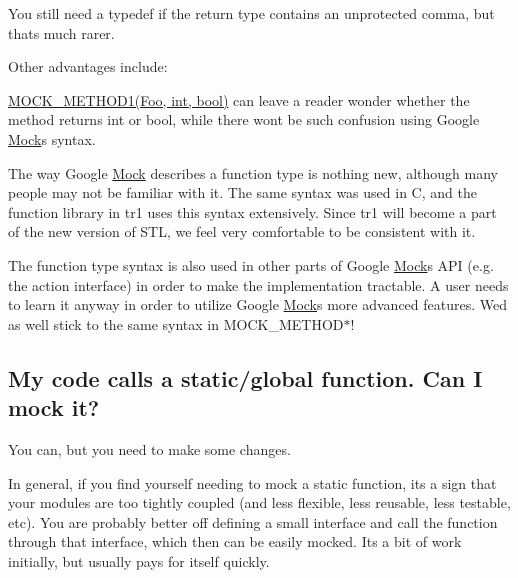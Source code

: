 You still need a {\ttfamily typedef} if the return type contains an unprotected comma, but that\textquotesingle{}s much rarer.

Other advantages include\+:
\begin{DoxyEnumerate}
\item {\ttfamily \hyperlink{gmock-generated-function-mockers_8h_ac49d366be035ee87b73264a29059cdc7}{M\+O\+C\+K\+\_\+\+M\+E\+T\+H\+O\+D1(\+Foo, int, bool)}} can leave a reader wonder whether the method returns {\ttfamily int} or {\ttfamily bool}, while there won\textquotesingle{}t be such confusion using Google \hyperlink{classMock}{Mock}\textquotesingle{}s syntax.
\end{DoxyEnumerate}
\begin{DoxyEnumerate}
\item The way Google \hyperlink{classMock}{Mock} describes a function type is nothing new, although many people may not be familiar with it. The same syntax was used in C, and the {\ttfamily function} library in {\ttfamily tr1} uses this syntax extensively. Since {\ttfamily tr1} will become a part of the new version of S\+TL, we feel very comfortable to be consistent with it.
\end{DoxyEnumerate}
\begin{DoxyEnumerate}
\item The function type syntax is also used in other parts of Google \hyperlink{classMock}{Mock}\textquotesingle{}s A\+PI (e.\+g. the action interface) in order to make the implementation tractable. A user needs to learn it anyway in order to utilize Google \hyperlink{classMock}{Mock}\textquotesingle{}s more advanced features. We\textquotesingle{}d as well stick to the same syntax in {\ttfamily M\+O\+C\+K\+\_\+\+M\+E\+T\+H\+O\+D$\ast$}!
\end{DoxyEnumerate}

\subsection*{My code calls a static/global function. Can I mock it?}

You can, but you need to make some changes.

In general, if you find yourself needing to mock a static function, it\textquotesingle{}s a sign that your modules are too tightly coupled (and less flexible, less reusable, less testable, etc). You are probably better off defining a small interface and call the function through that interface, which then can be easily mocked. It\textquotesingle{}s a bit of work initially, but usually pays for itself quickly.

